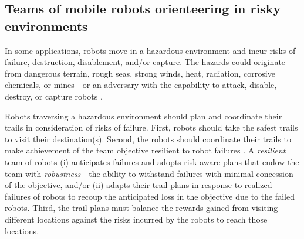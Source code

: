 \documentclass[11pt, oneside]{article}
\begin{document}
\subsection{Teams of mobile robots orienteering in risky environments} 
In some applications, robots move in a hazardous environment and incur risks of failure, destruction, disablement, and/or capture. 
The hazards could originate from dangerous terrain, rough seas, strong winds, heat, radiation, corrosive chemicals, or mines---or an adversary with the capability to attack, disable, destroy, or capture robots \cite{agmon2017robotic}. 

Robots traversing a hazardous environment should plan and coordinate their trails in consideration of risks of failure.
First, robots should take the safest trails to visit their destination(s). 
Second, the robots should coordinate their trails to make achievement of the team objective resilient to robot failures \cite{zhou2021multi}. 
A \emph{resilient} team of robots \cite{prorok2021beyond}
(i) anticipates failures and adopts risk-aware plans that endow the team with \emph{robustness}---the ability to withstand failures with minimal concession of the objective,
and/or
(ii) adapts their trail plans in response to realized failures of robots to recoup the anticipated loss in the objective due to the failed robots. 
Third, the trail plans must balance the rewards gained from visiting different locations against the risks incurred by the robots to reach those locations.
\end{document}
